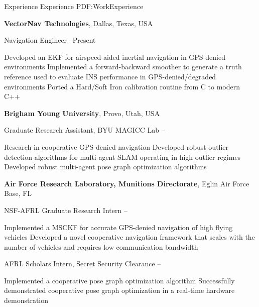 \documentclass[letterpaper,MMMyyyy,nonstopmode]{simpleresumecv}
\begin{document}
\begin{Body}



\Section
{Experience}
{Experience}
{PDF:WorkExperience}

\Entry
\textbf{VectorNav Technologies},
Dallas, Texas, USA

\Gap
\BulletItem
Navigation Engineer
\hfill
{}--Present
\begin{Detail}
\SubBulletItem
Developed an EKF for airspeed-aided inertial navigation in GPS-denied environments
\SubBulletItem
Implemented a forward-backward smoother to generate a truth reference used to evaluate INS performance in GPS-denied/degraded environments
\SubBulletItem
Ported a Hard/Soft Iron calibration routine from C to modern C++

\end{Detail}

\Entry
\textbf{Brigham Young University},
Provo, Utah, USA

\Gap
\BulletItem
Graduate Research Assistant, BYU MAGICC Lab
\hfill
{}--
\begin{Detail}
\SubBulletItem
Research in cooperative GPS-denied navigation
\SubBulletItem
Developed robust outlier detection algorithms for multi-agent SLAM operating in high outlier regimes
\SubBulletItem
Developed robust multi-agent pose graph optimization algorithms
\end{Detail}

\Entry
\textbf{Air Force Research Laboratory, Munitions Directorate},
Eglin Air Force Base, FL

\Gap
\BulletItem
NSF-AFRL Graduate Research Intern
\hfill
{}--
\begin{Detail}
\SubBulletItem
Implemented a MSCKF for accurate GPS-denied navigation of high flying vehicles
\SubBulletItem
Developed a novel cooperative navigation framework that scales with the number of vehicles and requires low communication bandwidth
\end{Detail}

\Gap
\BulletItem
AFRL Scholars Intern, Secret Security Clearance
\hfill
{}--
\begin{Detail}
\SubBulletItem
Implemented a cooperative pose graph optimization algorithm
\SubBulletItem
Successfully demonstrated cooperative pose graph optimization in a real-time hardware demonstration
\end{Detail}



\end{Body}
\end{document}
